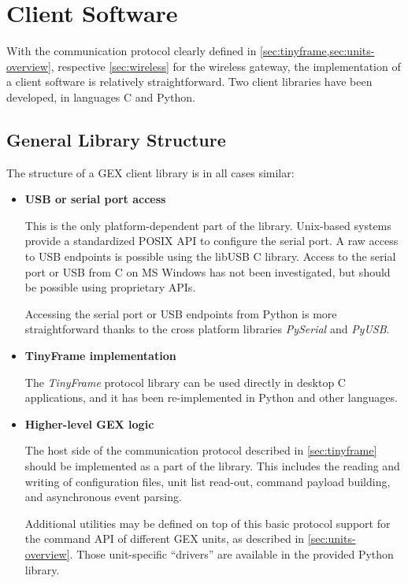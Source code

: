 \chapter{Client Software}

With the communication protocol clearly defined in \cref{sec:tinyframe,sec:units-overview}, respective \cref{sec:wireless} for the wireless gateway, the implementation of a client software is relatively straightforward. Two client libraries have been developed, in languages C and Python.

\section{General Library Structure}

The structure of a GEX client library is in all cases similar:

\begin{itemize}
    \item \textbf{USB or serial port access}

        This is the only platform-dependent part of the library. Unix-based systems provide a standardized POSIX API to configure the serial port. A raw access to \gls{USB} endpoints is possible using the libUSB C library. Access to the serial port or \gls{USB} from C on MS Windows has not been investigated, but should be possible using proprietary APIs.

        Accessing the serial port or \gls{USB} endpoints from Python is more straightforward thanks to the cross platform libraries \textit{PySerial} and \textit{PyUSB}.

    \item \textbf{TinyFrame implementation}

        The \textit{TinyFrame} protocol library can be used directly in desktop C applications, and it has been re-implemented in Python and other languages.

    \item \textbf{Higher-level GEX logic}

        The host side of the communication protocol described in \cref{sec:tinyframe} should be implemented as a part of the library. This includes the reading and writing of configuration files, unit list read-out, command payload building, and asynchronous event parsing.

        Additional utilities may be defined on top of this basic protocol support for the command API of different GEX units, as described in \cref{sec:units-overview}. Those unit-specific ``drivers'' are available in the provided Python library.
\end{itemize}

